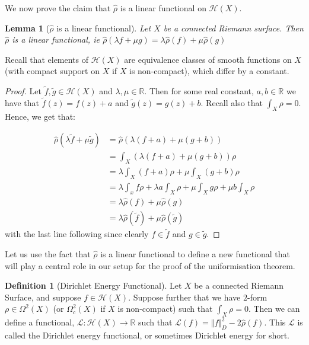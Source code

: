 \documentclass[11pt]{report}
\newtheorem{lemma}[thm]{Lemma}
\theoremstyle{definition}
\newtheorem{defn}[thm]{Definition}
\begin{document}
We now prove the claim that $\hat{\rho}$ is a linear functional on $\mathcal{H}(X)$.
\begin{lemma}[$\hat{\rho}$ is a linear functional]\label{rhohatlinear}
  Let $X$ be a connected Riemann surface. Then $\hat{\rho}$ is a linear functional, ie $\hat{\rho}(\lambda f+ \mu g) = \lambda \hat{\rho}(f) + \mu \hat{\rho}(g)$
\end{lemma}
Recall that elements of $\mathcal{H}(X)$ are equivalence classes of smooth functions on $X$ (with compact support on $X$ if $X$ is non-compact), which differ by a constant.
\begin{proof}
  Let $\tilde{f},\tilde{g} \in \mathcal{H}(X)$ and $\lambda,\mu \in \mathbb{R}$. Then for some real constant, $a,b \in \mathbb{R}$ we have that $\tilde{f}(z) = f(z) + a$ and $\tilde{g}(z) = g(z) + b$. Recall also that $\int_X \rho = 0$.
  Hence, we get that:

  \begin{align*}
    \hat{\rho}(\lambda \tilde{f}+ \mu \tilde{g}) &= \hat{\rho}(\lambda(f + a) + \mu(g + b)) \\
    &=\int_X (\lambda(f + a) + \mu(g + b))\rho \\
    &=\lambda \int_X (f + a)\rho + \mu \int_X (g + b)\rho \\
    &=\lambda \int_x f\rho + \lambda a\int_X \rho + \mu \int_X g\rho + \mu b\int_X \rho \\
    &=\lambda \hat{\rho}(f) + \mu \hat{\rho}(g)\\
    &=\lambda \hat{\rho}(\tilde{f}) + \mu \hat{\rho}(\tilde{g})
  \end{align*}
  with the last line following since clearly $f \in \tilde{f}$ and $g \in \tilde{g}$.
\end{proof}

Let us use the fact that $\hat{\rho}$ is a linear functional to define a new functional that will play a central role in our setup for the proof of the uniformisation theorem.

\begin{defn}[Dirichlet Energy Functional]
  Let $X$ be a connected Riemann Surface, and suppose $f \in \mathcal{H}(X)$. Suppose further that we have $2$-form $\rho \in \Omega^2 (X)$ (or $\Omega^2_c (X)$ if $X$ is non-compact) such that $\int_X \rho = 0$. Then we can define a functional, $\mathcal{L}: 
  \mathcal{H}(X) \rightarrow \mathbb{R}$ such that $\mathcal{L}(f) = \Vert f\Vert ^2_D - 2\hat{\rho}(f)$. This $\mathcal{L}$ is called the Dirichlet energy functional, or sometimes Dirichlet energy for short.
\end{defn}
\end{document}
